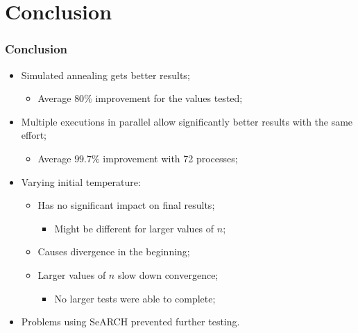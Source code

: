 \section{Conclusion}
\label{sec:conclusion}

\begin{frame}
	\frametitle{Conclusion}
	\begin{itemize}
		\vfill
		\item{Simulated annealing gets better results;
		\begin{itemize}
			\item{Average $80\%$ improvement for the values tested;}
		\end{itemize}
		}
		\vfill
		\item{Multiple executions in parallel allow significantly better results with the same effort;
		\begin{itemize}
			\item{Average $99.7\%$ improvement with 72 processes;}
		\end{itemize}
		}
		\vfill
		\item{Varying initial temperature:
		\begin{itemize}
			\item{Has no significant impact on final results;
			\begin{itemize}
				\item{Might be different for larger values of $n$;}
			\end{itemize}
			}
			\item{Causes divergence in the beginning;}
			\item{Larger values of $n$ slow down convergence;
			\begin{itemize}
				\item{No larger tests were able to complete;}
			\end{itemize}
			}
		\end{itemize}
		}
		\vfill
		\item{Problems using SeARCH prevented further testing.}
		\vfill
	\end{itemize}
\end{frame}